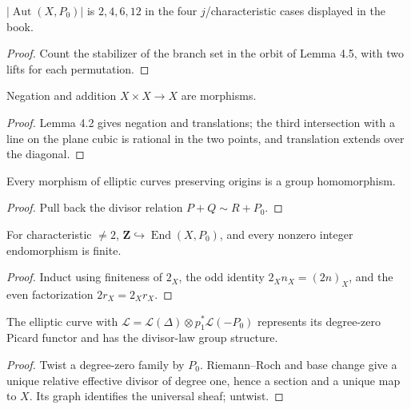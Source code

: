 \begin{corollary}\label{ha-ch4-c47}
\(|\operatorname{Aut}(X,P_0)|\) is \(2,4,6,12\) in the four \(j\)/characteristic
cases displayed in the book.
\end{corollary}
\begin{proof}
Count the stabilizer of the branch set in the orbit of Lemma 4.5, with two
lifts for each permutation.
\end{proof}

\begin{proposition}\label{ha-ch4-p48}
Negation and addition \(X\times X\to X\) are morphisms.
\end{proposition}
\begin{proof}
Lemma 4.2 gives negation and translations; the third intersection with a line
on the plane cubic is rational in the two points, and translation extends over
the diagonal.
\end{proof}
\begin{lemma}[Homomorphism]\label{ha-ch4-l49}
Every morphism of elliptic curves preserving origins is a group homomorphism.
\end{lemma}
\begin{proof}
Pull back the divisor relation \(P+Q\sim R+P_0\).
\end{proof}
\begin{proposition}\label{ha-ch4-p410}
For characteristic \(\ne2\), \(\mathbf Z\hookrightarrow\operatorname{End}(X,P_0)\),
and every nonzero integer endomorphism is finite.
\end{proposition}
\begin{proof}
Induct using finiteness of \(2_X\), the odd identity
\(2_Xn_X=(2n)_X\), and the even factorization \(2r_X=2_Xr_X\).
\end{proof}

\begin{theorem}[Jacobian]\label{ha-ch4-t411}
The elliptic curve with
\(\mathcal L=\mathcal L(\Delta)\otimes p_1^*\mathcal L(-P_0)\) represents its
degree-zero Picard functor and has the divisor-law group structure.
\end{theorem}
\begin{proof}
Twist a degree-zero family by \(P_0\).  Riemann--Roch and base change give a
unique relative effective divisor of degree one, hence a section and a unique
map to \(X\).  Its graph identifies the universal sheaf; untwist.
\end{proof}


